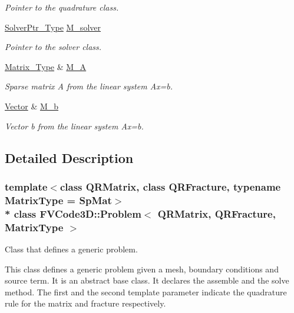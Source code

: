 \begin{DoxyCompactItemize}
\begin{DoxyCompactList}\small\item\em Pointer to the quadrature class. \end{DoxyCompactList}\item 
\hyperlink{namespaceFVCode3D_a0b32227a4e5847c2fb27215fb81d9363}{Solver\+Ptr\+\_\+\+Type} \hyperlink{classFVCode3D_1_1Problem_a0dca07f85c16083308d98f518685e3e9}{M\+\_\+solver}
\begin{DoxyCompactList}\small\item\em Pointer to the solver class. \end{DoxyCompactList}\item 
\hyperlink{classFVCode3D_1_1Problem_a91f0670813837256bdc1c149fdcc1fd5}{Matrix\+\_\+\+Type} \& \hyperlink{classFVCode3D_1_1Problem_ac105e74d7992025d275c2fae5a77bc12}{M\+\_\+A}
\begin{DoxyCompactList}\small\item\em Sparse matrix A from the linear system Ax=b. \end{DoxyCompactList}\item 
\hyperlink{namespaceFVCode3D_a16ccf345652402bccd1a5d2e6782526c}{Vector} \& \hyperlink{classFVCode3D_1_1Problem_a65a00ab96a21f389f50f273614f977d4}{M\+\_\+b}
\begin{DoxyCompactList}\small\item\em Vector b from the linear system Ax=b. \end{DoxyCompactList}\end{DoxyCompactItemize}


\subsection{Detailed Description}
\subsubsection*{template$<$class Q\+R\+Matrix, class Q\+R\+Fracture, typename Matrix\+Type = Sp\+Mat$>$\\*
class F\+V\+Code3\+D\+::\+Problem$<$ Q\+R\+Matrix, Q\+R\+Fracture, Matrix\+Type $>$}

Class that defines a generic problem. 

This class defines a generic problem given a mesh, boundary conditions and source term. It is an abstract base class. It declares the assemble and the solve method. The first and the second template parameter indicate the quadrature rule for the matrix and fracture respectively. 

